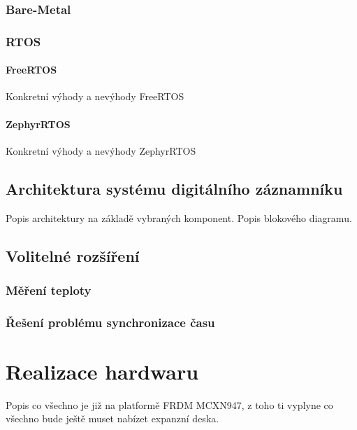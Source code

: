 \subsection{Bare-Metal}

\subsection{RTOS}
\subsubsection{FreeRTOS}
Konkretní výhody a nevýhody FreeRTOS

\subsubsection{ZephyrRTOS}
Konkretní výhody a nevýhody ZephyrRTOS


\section{Architektura systému digitálního záznamníku}
Popis architektury na základě vybraných komponent. Popis blokového diagramu.


\section{Volitelné rozšíření}
\subsection{Měření teploty}


\subsection{Řešení problému synchronizace času}


\chapter{Realizace hardwaru}
Popis co všechno je již na platformě FRDM MCXN947, z toho ti vyplyne co všechno bude ještě muset nabízet expanzní deska.
